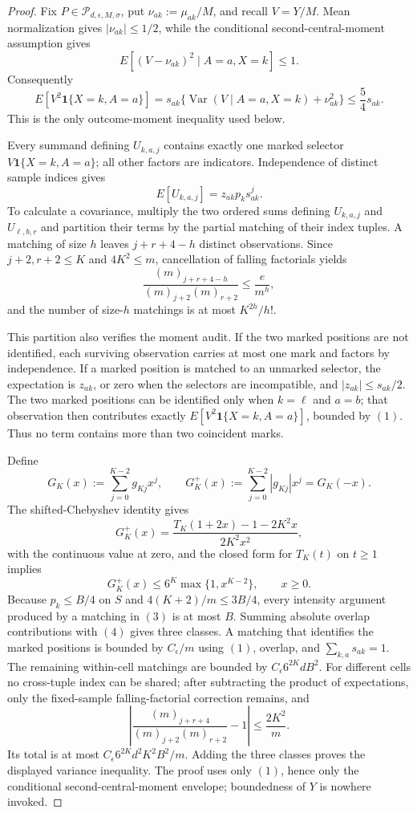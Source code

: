 \documentclass{article}
\begin{document}
\begin{proof}
Fix \(P\in\mathcal P_{d,\epsilon,M,\sigma}\), put \(\nu_{ak}:=\mu_{ak}/M\), and recall \(V=Y/M\).  Mean normalization gives \(|\nu_{ak}|\le1/2\), while the conditional second-central-moment assumption gives
\[
 E[(V-\nu_{ak})^2\mid A=a,X=k]\le1.
\]
Consequently
\[
 E[V^2\mathbf 1\{X=k,A=a\}]
 =s_{ak}\{\operatorname{Var}(V\mid A=a,X=k)+\nu_{ak}^2\}
 \le\frac54s_{ak}.
\tag{1}
\]
This is the only outcome-moment inequality used below.

Every summand defining \(U_{k,a,j}\) contains exactly one marked selector \(V\mathbf 1\{X=k,A=a\}\); all other factors are indicators.  Independence of distinct sample indices gives
\[
 E[U_{k,a,j}]=z_{ak}p_ks_{ak}^{j}.
\tag{2}
\]
To calculate a covariance, multiply the two ordered sums defining \(U_{k,a,j}\) and \(U_{\ell,b,r}\) and partition their terms by the partial matching of their index tuples.  A matching of size \(h\) leaves \(j+r+4-h\) distinct observations.  Since \(j+2,r+2\le K\) and \(4K^2\le m\), cancellation of falling factorials yields
\[
 \frac{(m)_{j+r+4-h}}{(m)_{j+2}(m)_{r+2}}
 \le\frac e{m^h},
\tag{3}
\]
and the number of size-\(h\) matchings is at most \(K^{2h}/h!\).

This partition also verifies the moment audit.  If the two marked positions are not identified, each surviving observation carries at most one mark and factors by independence.  If a marked position is matched to an unmarked selector, the expectation is \(z_{ak}\), or zero when the selectors are incompatible, and \(|z_{ak}|\le s_{ak}/2\).  The two marked positions can be identified only when \(k=\ell\) and \(a=b\); that observation then contributes exactly \(E[V^2\mathbf 1\{X=k,A=a\}]\), bounded by \((1)\).  Thus no term contains more than two coincident marks.

Define
\[
 G_K(x):=\sum_{j=0}^{K-2}g_{Kj}x^j,
 \qquad G_K^+(x):=\sum_{j=0}^{K-2}|g_{Kj}|x^j=G_K(-x).
\]
The shifted-Chebyshev identity gives
\[
 G_K^+(x)=\frac{T_K(1+2x)-1-2K^2x}{2K^2x^2},
\]
with the continuous value at zero, and the closed form for \(T_K(t)\) on \(t\ge1\) implies
\[
 G_K^+(x)\le6^K\max\{1,x^{K-2}\},\qquad x\ge0.
\tag{4}
\]
Because \(p_k\le B/4\) on \(S\) and \(4(K+2)/m\le3B/4\), every intensity argument produced by a matching in \((3)\) is at most \(B\).  Summing absolute overlap contributions with \((4)\) gives three classes.  A matching that identifies the marked positions is bounded by \(C_{\epsilon}/m\) using \((1)\), overlap, and \(\sum_{k,a}s_{ak}=1\).  The remaining within-cell matchings are bounded by \(C_{\epsilon}6^{2K}dB^2\).  For different cells no cross-tuple index can be shared; after subtracting the product of expectations, only the fixed-sample falling-factorial correction remains, and
\[
 \left|\frac{(m)_{j+r+4}}{(m)_{j+2}(m)_{r+2}}-1\right|
 \le\frac{2K^2}{m}.
\tag{5}
\]
Its total is at most \(C_{\epsilon}6^{2K}d^2K^2B^2/m\).  Adding the three classes proves the displayed variance inequality.  The proof uses only \((1)\), hence only the conditional second-central-moment envelope; boundedness of \(Y\) is nowhere invoked.
\end{proof}
\end{document}
